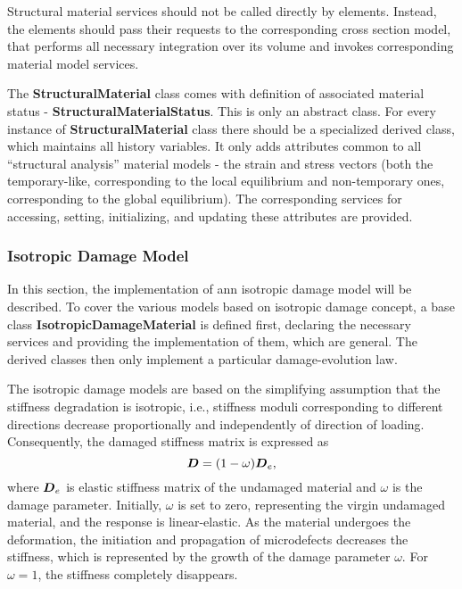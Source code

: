 \documentclass[12pt,draft]{article}
\newcommand{\class}[1]{{\bf #1}}
\newcommand{\mbf}[1]{\mbox{\boldmath$#1$}}
\begin{document}
 Structural material services should not be called directly by
 elements. Instead, the elements should 
 pass their requests to the corresponding cross section model, that performs all necessary integration over 
 its volume and invokes corresponding material model services.

 The \class{StructuralMaterial} class comes with definition of
 associated material status - \class{StructuralMaterialStatus}.
 This is only an abstract class. For every instance of
 \class{StructuralMaterial} class 
 there should be a specialized derived class, which maintains all history variables.
 It only adds attributes common to all ``structural analysis'' material models - the
 strain and stress vectors (both the temporary-like, corresponding to
 the local
 equilibrium and non-temporary ones, corresponding to the global equilibrium). The corresponding services
 for accessing, setting, initializing, and updating these attributes are provided.

 \subsubsection{Isotropic Damage Model}
 In this section, the implementation of ann isotropic damage model will be
 described. To cover the various models based on isotropic damage concept,
 a base class \class{IsotropicDamageMaterial} is defined first,
 declaring the necessary services and providing the implementation of
 them, which are general. The derived classes then only  implement a particular
 damage-evolution law.

 The isotropic damage models are based on the simplifying assumption
 that the stiffness degradation is isotropic, i.e., stiffness moduli
 corresponding to different directions decrease proportionally and
 independently of direction of loading. Consequently, the damaged
 stiffness matrix is expressed as
 $$
   \mbf{D} = (1-\omega)\mbf{D}_e,
 $$
 where $\mbf{D}_e$ is elastic stiffness matrix of the undamaged
 material and $\omega$ is the damage parameter. Initially, $\omega$ is
 set to zero, representing the virgin undamaged material, and the response is
 linear-elastic. As the material undergoes the deformation, the
 initiation and propagation of microdefects decreases the stiffness,
 which is represented by the growth of the damage parameter $\omega$.
 For $\omega = 1$, the stiffness completely disappears.
\end{document}
